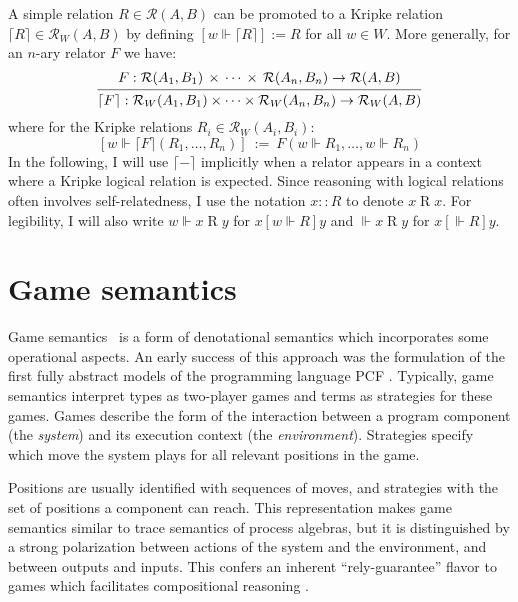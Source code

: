 \documentclass[11pt,oneside,draft]{book}
\theoremstyle{definition}
\newcommand{\ifr}[1]{\mathrel{[{#1}]}}
\begin{document}
A simple relation $R \in \mathcal{R}(A, B)$
can be promoted to a Kripke relation
$\lceil R \rceil \in \mathcal{R}_W(A, B)$
by defining $[w \Vdash \lceil R \rceil] := R$ for all $w \in W$.
More generally, for an $n$-ary relator $F$ we have:
\[
  \begin{prooftree}
  \hypo{
    F :
      \mathcal{R}(A_1, B_1) \,\times\,\cdots\,\times\,\mathcal{R}(A_n, B_n)
      \rightarrow \mathcal{R}(A, B)}
  \infer1{
    \lceil F \rceil :
      \mathcal{R}_W(A_1, B_1) \times \cdots \times \mathcal{R}_W(A_n, B_n)
      \rightarrow \mathcal{R}_W(A, B)}
  \end{prooftree}
\]
where for the Kripke relations $R_i \in \mathcal{R}_W(A_i, B_i)$:
\[
  [w \Vdash \lceil F \rceil (R_1, \ldots, R_n)] \: := \:
    F(w \Vdash R_1, \ldots, w \Vdash R_n)
\]
In the following,
I will use $\lceil - \rceil$ implicitly
when a relator appears in a context where
a Kripke logical relation is expected.
Since reasoning with logical relations
often involves self-relatedness,
I use the notation
$x :: R$ to denote $x \mathrel{R} x$.
For legibility, I will also write
$w \Vdash x \mathrel{R} y$ for $x \ifr{w \Vdash R} y$
and $\Vdash x \mathrel{R} y$ for $x \ifr{\Vdash R} y$.


\section{Game semantics} \label{sec:bg:gamesem} %


Game semantics~\citep{gsll,gamesem99}
is a form of denotational semantics which
incorporates some operational aspects.
An early success of this approach was
the formulation of the first fully abstract models
of the programming language PCF \citep{pcfajm,pcfho}.
Typically,
game semantics interpret
types as two-player games
and terms as strategies for these games.
Games describe the form of the interaction
between a program component %
(the \emph{system})
and its execution context
(the \emph{environment}).
Strategies
specify which move the system plays
for all relevant positions in the game.

Positions are usually identified with sequences of moves,
and strategies with the set of positions
a component can reach.
This representation makes
game semantics similar to
trace semantics of process algebras,
but it is distinguished
by a strong polarization between
actions of the system and the environment,
and between outputs and inputs.
This confers an inherent ``rely-guarantee'' flavor
to games which facilitates compositional reasoning
\citep{cspgs}.
\end{document}
